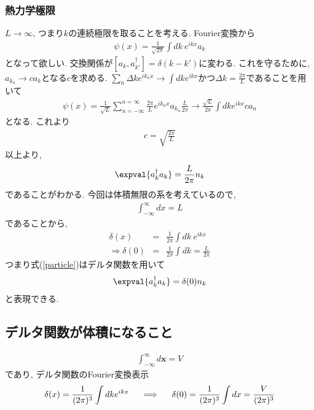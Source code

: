 \subsubsection{熱力学極限}
$L\rightarrow\infty$, つまり$k$の連続極限を取ることを考える. Fourier変換から
\begin{eqnarray}
  \psi(x) = \frac{1}{\sqrt{2\pi}}\int dk\ e^{ikx}a_k
\end{eqnarray}
となって欲しい. 交換関係が$[a_k, a_{k'}^\dagger] = \delta(k - k')$に変わる. これを守るために, $a_{k_n}\rightarrow ca_k$となる$c$を求める. $\sum_n\Delta ke^{ik_nx}\rightarrow\int dk e^{ikx}$かつ$\Delta k = \frac{2\pi}{L}$であることを用いて
\begin{eqnarray}
  \psi(x) = \frac{1}{\sqrt{L}}\sum_{n=-\infty}^{n=\infty}\frac{2\pi}{L}e^{ik_nx}a_{k_n}\frac{L}{2\pi}\rightarrow \frac{\sqrt{L}}{2\pi}\int dk e^{ikx} ca_n
\end{eqnarray}
となる. これより
\begin{eqnarray}
  c = \sqrt{\frac{2\pi}{L}}
\end{eqnarray}
以上より,
\begin{eqnarray}
  \expval{a_k^\dagger a_k} = \frac{L}{2\pi}n_k\label{particle}
\end{eqnarray}
であることがわかる. 今回は体積無限の系を考えているので,
\begin{eqnarray}
  \int_{-\infty}^\infty dx = L
\end{eqnarray}
であることから,
\begin{eqnarray}
  \delta(x) &=& \frac{1}{2\pi}\int dk\  e^{ikx}\\
  \Longrightarrow \delta(0) &=& \frac{1}{2\pi}\int dk = \frac{L}{2\pi}
\end{eqnarray}
つまり式(\ref{particle})はデルタ関数を用いて
\begin{eqnarray}
  \expval{a_k^\dagger a_k} = \delta(0)n_k\label{particle}
\end{eqnarray}
と表現できる.
\subsection{デルタ関数が体積になること}
\begin{eqnarray}
  \int^\infty_{-\infty} d\bm{x} = V
\end{eqnarray}
であり, デルタ関数のFourier変換表示
\begin{eqnarray}
  \delta(x) = \frac{1}{(2\pi)^3}\int dk e^{ikx}\hspace{0.5cm}\Longrightarrow \hspace{0.5cm}\delta(0) = \frac{1}{(2\pi)^3}\int dx = \frac{V}{(2\pi)^3}\label{delta-volume}
\end{eqnarray}

